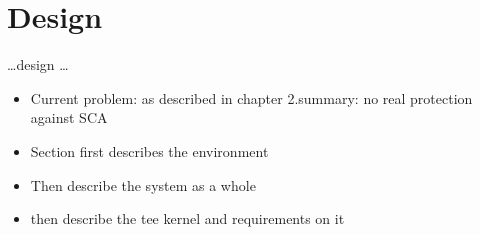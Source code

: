 \chapter{Design}
\label{sec:design}



\ldots design \ldots

\begin{itemize}
      \item Current problem: as described in chapter 2.summary: no real protection against SCA
      \item Section first describes the environment
      \item Then describe the system as a whole
      \item then describe the tee kernel and requirements on it
\end{itemize}

